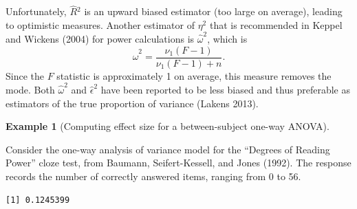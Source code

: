 \documentclass[
  11pt,
  letterpaper,
]{scrbook}
\newenvironment{Shaded}{\begin{snugshade}}{\end{snugshade}}
\newcommand{\AttributeTok}[1]{\textcolor[rgb]{0.40,0.45,0.13}{#1}}
\newcommand{\CommentTok}[1]{\textcolor[rgb]{0.37,0.37,0.37}{#1}}
\newcommand{\DecValTok}[1]{\textcolor[rgb]{0.68,0.00,0.00}{#1}}
\newcommand{\FunctionTok}[1]{\textcolor[rgb]{0.28,0.35,0.67}{#1}}
\newcommand{\NormalTok}[1]{\textcolor[rgb]{0.00,0.23,0.31}{#1}}
\newcommand{\OtherTok}[1]{\textcolor[rgb]{0.00,0.23,0.31}{#1}}
\newcommand{\SpecialCharTok}[1]{\textcolor[rgb]{0.37,0.37,0.37}{#1}}
\newcommand{\StringTok}[1]{\textcolor[rgb]{0.13,0.47,0.30}{#1}}
\theoremstyle{definition}
\theoremstyle{definition}
\newtheorem{example}{Example}[chapter]
\theoremstyle{remark}
\begin{document}
Unfortunately, \(\widehat{R}{}^2\) is an upward biased estimator (too
large on average), leading to optimistic measures. Another estimator of
\(\eta^2\) that is recommended in Keppel and Wickens (2004) for power
calculations is \(\widehat{\omega}^2\), which is
\[\widehat{\omega}^2 = \frac{\nu_1 (F-1)}{\nu_1(F-1)+n}.\] Since the
\(F\) statistic is approximately 1 on average, this measure removes the
mode. Both \(\widehat{\omega}^2\) and \(\widehat{\epsilon}^2\) have been
reported to be less biased and thus preferable as estimators of the true
proportion of variance (Lakens 2013).

\begin{example}[Computing effect size for a between-subject one-way
ANOVA]\protect\hypertarget{exm-calculation-effect-anova}{}\label{exm-calculation-effect-anova}

Consider the one-way analysis of variance model for the ``Degrees of
Reading Power'' cloze test, from Baumann, Seifert-Kessell, and Jones
(1992). The response records the number of correctly answered items,
ranging from 0 to 56.

\begin{Shaded}
\end{Shaded}

\begin{verbatim}
[1] 0.1245399
\end{verbatim}


\end{example}
\end{document}
